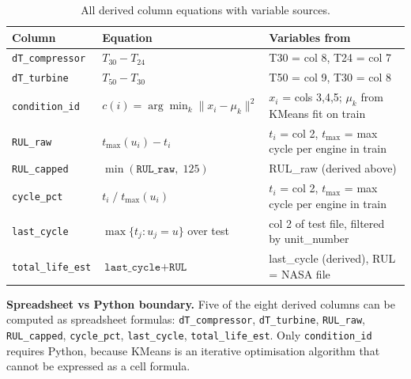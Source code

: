 \documentclass[11pt, a4paper]{article}
\begin{document}
\begin{table}[H]
\centering
\caption{All derived column equations with variable sources.}
\label{tab:equations}
\small
\begin{tabular}{@{}lp{5.5cm}p{5.5cm}@{}}
\toprule
Column & Equation & Variables from \\
\midrule
\texttt{dT\_compressor} &
  $T_{30} - T_{24}$ &
  T30 = col 8, T24 = col 7 \\[4pt]

\texttt{dT\_turbine} &
  $T_{50} - T_{30}$ &
  T50 = col 9, T30 = col 8 \\[4pt]

\texttt{condition\_id} &
  $c(i) = \arg\min_k \|x_i - \mu_k\|^2$ &
  $x_i$ = cols 3,4,5; $\mu_k$ from KMeans fit on train \\[4pt]

\texttt{RUL\_raw} &
  $t_{\max}(u_i) - t_i$ &
  $t_i$ = col 2, $t_{\max}$ = max cycle per engine in train \\[4pt]

\texttt{RUL\_capped} &
  $\min(\texttt{RUL\_raw},\; 125)$ &
  RUL\_raw (derived above) \\[4pt]

\texttt{cycle\_pct} &
  $t_i \;/\; t_{\max}(u_i)$ &
  $t_i$ = col 2, $t_{\max}$ = max cycle per engine in train \\[4pt]

\texttt{last\_cycle} &
  $\max\{t_j : u_j = u\}$ over test &
  col 2 of test file, filtered by unit\_number \\[4pt]

\texttt{total\_life\_est} &
  $\texttt{last\_cycle} + \texttt{RUL}$ &
  last\_cycle (derived), RUL = NASA file \\
\bottomrule
\end{tabular}
\end{table}

\begin{keybox}
\textbf{Spreadsheet vs Python boundary.}
Five of the eight derived columns can be computed as spreadsheet
formulas: \texttt{dT\_compressor}, \texttt{dT\_turbine},
\texttt{RUL\_raw}, \texttt{RUL\_capped}, \texttt{cycle\_pct},
\texttt{last\_cycle}, \texttt{total\_life\_est}.
Only \texttt{condition\_id} requires Python, because KMeans is an
iterative optimisation algorithm that cannot be expressed as a
cell formula.
\end{keybox}

\end{document}

